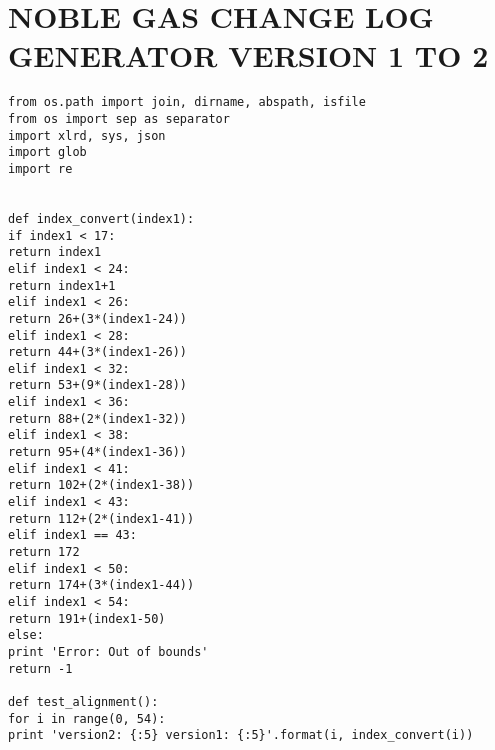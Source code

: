 
\appendix    %

\chapter{NOBLE GAS CHANGE LOG GENERATOR VERSION 1 TO 2}
\begin{verbatim}
from os.path import join, dirname, abspath, isfile
from os import sep as separator
import xlrd, sys, json
import glob
import re


def index_convert(index1):
if index1 < 17:
return index1
elif index1 < 24:
return index1+1
elif index1 < 26:
return 26+(3*(index1-24))
elif index1 < 28:
return 44+(3*(index1-26))
elif index1 < 32:
return 53+(9*(index1-28))
elif index1 < 36:
return 88+(2*(index1-32))
elif index1 < 38:
return 95+(4*(index1-36))
elif index1 < 41:
return 102+(2*(index1-38))
elif index1 < 43:
return 112+(2*(index1-41))
elif index1 == 43:
return 172
elif index1 < 50:
return 174+(3*(index1-44))
elif index1 < 54:
return 191+(index1-50)
else:
print 'Error: Out of bounds'
return -1

def test_alignment():
for i in range(0, 54):
print 'version2: {:5} version1: {:5}'.format(i, index_convert(i))


\end{verbatim}
